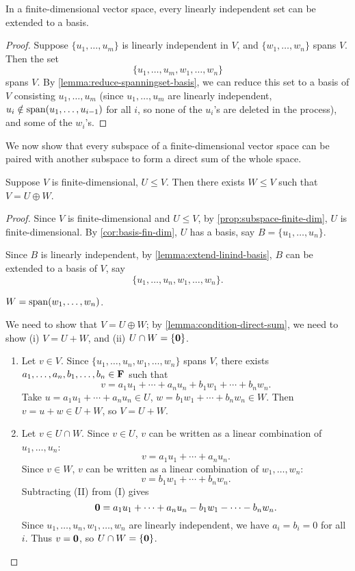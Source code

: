 \begin{lemma}\label{lemma:extend-linind-basis}
In a finite-dimensional vector space, every linearly independent set can be extended to a basis.
\end{lemma}

\begin{proof}
Suppose $\{u_1,\dots,u_m\}$ is linearly independent in $V$, and $\{w_1,\dots,w_n\}$ spans $V$. Then the set
\[\{u_1,\dots,u_m,w_1,\dots,w_n\}\]
spans $V$. By \ref{lemma:reduce-spanningset-basis}, we can reduce this set to a basis of $V$ consisting $u_1,\dots,u_m$ (since $u_1,\dots,u_m$ are linearly independent, $u_i\notin\operatorname{span}(u_1,\dots,u_{i-1})$ for all $i$, so none of the $u_i$'s are deleted in the process), and some of the $w_i$'s.
\end{proof}

We now show that every subspace of a finite-dimensional vector space can be paired with another subspace to form a direct sum of the whole space.

\begin{corollary}
Suppose $V$ is finite-dimensional, $U\le V$. Then there exists $W\le V$ such that $V=U\oplus W$.
\end{corollary}

\begin{proof}
Since $V$ is finite-dimensional and $U\le V$, by \ref{prop:subspace-finite-dim}, $U$ is finite-dimensional. By \ref{cor:basis-fin-dim}, $U$ has a basis, say $B=\{u_1,\dots,u_n\}$.

Since $B$ is linearly independent, by \ref{lemma:extend-linind-basis}, $B$ can be extended to a basis of $V$, say
\[\{u_1,\dots,u_n,w_1,\dots,w_n\}.\]
\begin{claim}
$W=\operatorname{span}(w_1,\dots,w_n)$.
\end{claim}
We need to show that $V=U\oplus W$; by \ref{lemma:condition-direct-sum}, we need to show (i) $V=U+W$, and (ii) $U\cap W=\{\vb{0}\}$.
\begin{enumerate}[label=(\roman*)]
\item Let $v\in V$. Since $\{u_1,\dots,u_n,w_1,\dots,w_n\}$ spans $V$, there exists $a_1,\dots,a_n,b_1,\dots,b_n\in\mathbf F$ such that
\[v=a_1u_1+\cdots+a_nu_n+b_1w_1+\cdots+b_nw_n.\]
Take $u=a_1u_1+\cdots+a_nu_n\in U$, $w=b_1w_1+\cdots+b_nw_n\in W$. Then $v=u+w\in U+W$, so $V=U+W$.
\item Let $v\in U\cap W$. Since $v\in U$, $v$ can be written as a linear combination of $u_1,\dots,u_n$:
\begin{equation*}\tag{I}
v=a_1u_1+\cdots+a_nu_n.
\end{equation*}
Since $v\in W$, $v$ can be written as a linear combination of $w_1,\dots,w_n$:
\begin{equation*}\tag{II}
v=b_1w_1+\cdots+b_nw_n.
\end{equation*}
Subtracting (II) from (I) gives
\[\vb{0}=a_1u_1+\cdots+a_nu_n-b_1w_1-\cdots-b_nw_n.\]
Since $u_1,\dots,u_n,w_1,\dots,w_n$ are linearly independent, we have $a_i=b_i=0$ for all $i$. Thus $v=\vb{0}$, so $U\cap W=\{\vb{0}\}$.
\end{enumerate}
\end{proof}
\pagebreak

